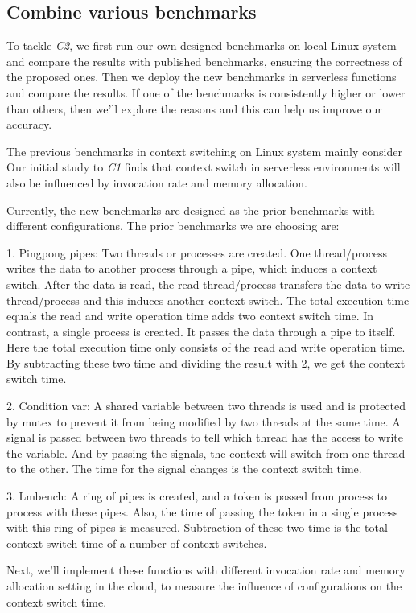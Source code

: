 \subsection{Combine various benchmarks}
	To tackle \emph{C2}, we first run our own designed benchmarks on local Linux system and compare the results with published benchmarks\cite{cs-lmbench,cs-pipes,cs-arm,cs-web},
	 ensuring the correctness of the proposed ones. Then we deploy the new benchmarks in serverless functions and compare the results. 
	 If one of the benchmarks is consistently higher or lower than others, then we'll explore the reasons and this can help us improve our accuracy.

	The previous benchmarks in context switching on Linux system mainly consider %
	Our initial study to \emph{C1} finds that context switch in serverless environments will also be influenced by invocation rate and memory allocation.   

	Currently, the new benchmarks are designed as the prior benchmarks with different configurations.
	The prior benchmarks we are choosing are:
	
	1. Pingpong pipes\cite{cs-pipes,cs-web}: Two threads or processes are created. 
		      One thread/process writes the data to another process through a pipe, which induces a context switch. 
			  After the data is read, the read thread/process transfers the data to write thread/process and this induces another context switch.
			  The total execution time equals the read and write operation time adds two context switch time.
			  In contrast, a single process is created. It passes the data through a pipe to itself. 
			  Here the total execution time only consists of the read and write operation time.
			  By subtracting these two time and dividing the result with 2, we get the context switch time.
	
	2. Condition var\cite{cs-web}: A shared variable between two threads is used and is protected by mutex to prevent it from being modified by two threads at the same time.
		      A signal is passed between two threads to tell which thread has the access to write the variable.
			  And by passing the signals, the context will switch from one thread to the other. 
			  The time for the signal changes is the context switch time.
	
	3.  Lmbench\cite{cs-lmbench}: A ring of pipes is created, and a token is passed from process to process with these pipes. 
	          Also, the time of passing the token in a single process with this ring of pipes is measured. 
			  Subtraction of these two time is the total context switch time of a number of context switches.

	Next, we'll implement these functions with different invocation rate and memory allocation setting in the cloud,
	to measure the influence of configurations on the context switch time.

